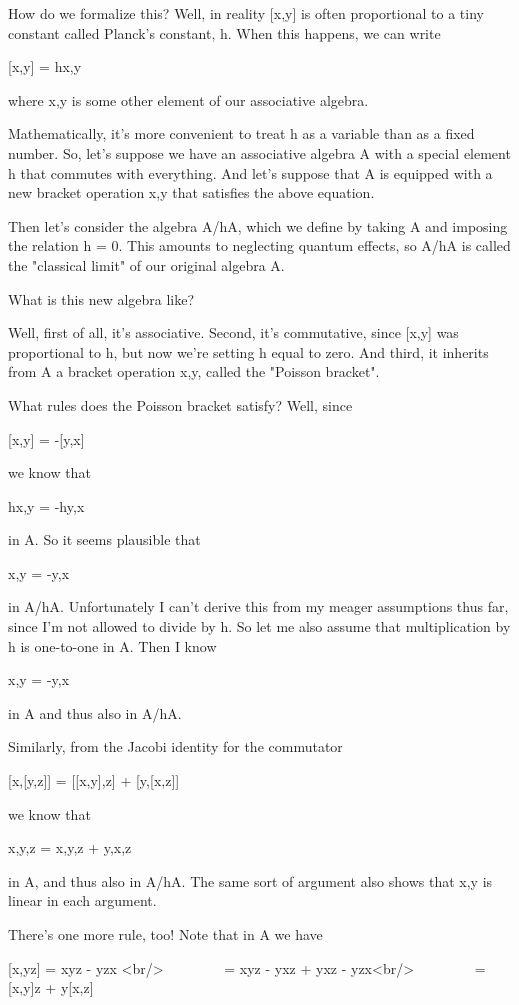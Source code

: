 How do we formalize this?  Well, in reality [x,y] is often
proportional to a tiny constant called Planck's constant, h.  
When this happens, we can write

[x,y] = h{x,y}

where {x,y} is some other element of our associative algebra.  

Mathematically, it's more convenient to treat h as a variable than
as a fixed number. 
So, let's suppose we have an associative algebra A with a special
element h that commutes with everything.  
And let's suppose that A is
equipped with a new bracket operation {x,y} that satisfies the above
equation.

Then let's consider the algebra A/hA, which we define by taking A and
imposing the relation h = 0.  This amounts to neglecting quantum
effects, so A/hA is called the "classical limit" of our original
algebra A.  

What is this new algebra like?

Well, first of all, it's associative.  Second, it's commutative, since
[x,y] was proportional to h, but now we're setting h equal to zero.
And third, it inherits from A a bracket operation {x,y}, called the
"Poisson bracket".

What rules does the Poisson bracket satisfy?  Well, since 

[x,y] = -[y,x]

we know that

h{x,y} = -h{y,x}

in A.  So it seems plausible that

{x,y} = -{y,x}

in A/hA.  Unfortunately I can't derive this from my meager assumptions
thus far, since I'm not allowed to divide by h.  So let me also assume
that multiplication by h is one-to-one in A.  Then I know

{x,y} = -{y,x}

in A and thus also in A/hA.

Similarly, from the Jacobi identity for the commutator

[x,[y,z]] = [[x,y],z] + [y,[x,z]]

we know that

{x,{y,z}} = {{x,y},z} + {y,{x,z}}

in A, and thus also in A/hA.  The same sort of argument also shows
that {x,y} is linear in each argument.

There's one more rule, too!  Note that in A we have

[x,yz] = xyz - yzx <br/>
\ \ \ \ \ \ \ \ 
       = xyz - yxz + yxz - yzx<br/>
\ \ \ \ \ \ \ \ 
       = [x,y]z + y[x,z]

